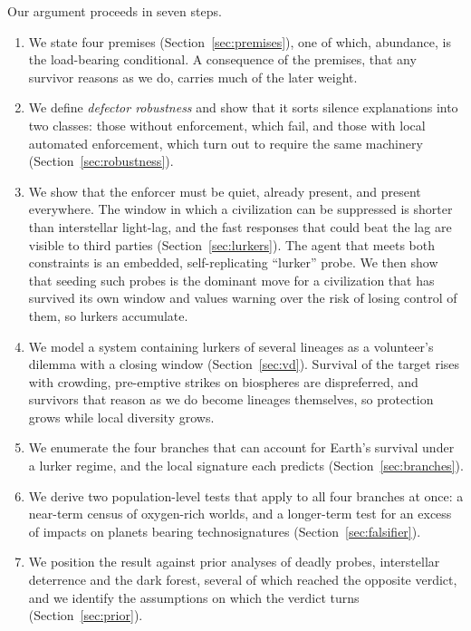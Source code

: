 \documentclass[preprint,12pt]{elsarticle}
\theoremstyle{definition}
\begin{document}
Our argument proceeds in seven steps.
\begin{enumerate}
  \item We state four premises (Section~\ref{sec:premises}), one of which, abundance, is the load-bearing conditional. A consequence of the premises, that any survivor reasons as we do, carries much of the later weight.
  \item We define \emph{defector robustness} and show that it sorts silence explanations into two classes: those without enforcement, which fail, and those with local automated enforcement, which turn out to require the same machinery (Section~\ref{sec:robustness}).
  \item We show that the enforcer must be quiet, already present, and present everywhere. The window in which a civilization can be suppressed is shorter than interstellar light-lag, and the fast responses that could beat the lag are visible to third parties (Section~\ref{sec:lurkers}). The agent that meets both constraints is an embedded, self-replicating ``lurker'' probe. We then show that seeding such probes is the dominant move for a civilization that has survived its own window and values warning over the risk of losing control of them, so lurkers accumulate.
  \item We model a system containing lurkers of several lineages as a volunteer's dilemma with a closing window (Section~\ref{sec:vd}). Survival of the target rises with crowding, pre-emptive strikes on biospheres are dispreferred, and survivors that reason as we do become lineages themselves, so protection grows while local diversity grows.
  \item We enumerate the four branches that can account for Earth's survival under a lurker regime, and the local signature each predicts (Section~\ref{sec:branches}).
  \item We derive two population-level tests that apply to all four branches at once: a near-term census of oxygen-rich worlds, and a longer-term test for an excess of impacts on planets bearing technosignatures (Section~\ref{sec:falsifier}).
  \item We position the result against prior analyses of deadly probes, interstellar deterrence and the dark forest, several of which reached the opposite verdict, and we identify the assumptions on which the verdict turns (Section~\ref{sec:prior}).
\end{enumerate}

\end{document}
